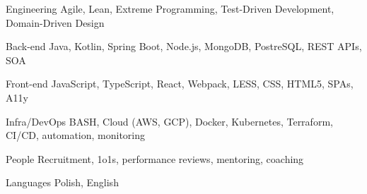 

\begin{cvskills}

  \cvskill
    {Engineering} %
    {Agile, Lean, Extreme Programming, Test-Driven Development, Domain-Driven Design} %

  \cvskill
    {Back-end} %
    {Java, Kotlin, Spring Boot, Node.js, MongoDB, PostreSQL, REST APIs, SOA} %

  \cvskill
    {Front-end} %
    {JavaScript, TypeScript, React, Webpack, LESS, CSS, HTML5, SPAs, A11y} %

  \cvskill
    {Infra/DevOps} %
    {BASH, Cloud (AWS, GCP), Docker, Kubernetes, Terraform, CI/CD, automation, monitoring} %

  \cvskill
    {People} %
    {Recruitment, 1o1s, performance reviews, mentoring, coaching} %

  \cvskill
    {Languages} %
    {Polish, English} %

\end{cvskills}
